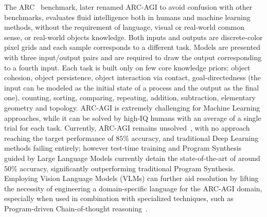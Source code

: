 The ARC~\cite{chollet2019measure} benchmark, later renamed ARC-AGI to avoid confusion with other benchmarks, evaluates fluid intelligence both in humans and machine learning methods, without the requirement of language, visual or real-world common sense, or real-world objects knowledge.
Both inputs and outputs are discrete-color pixel grids and each sample corresponds to a different task.
Models are presented with three input/output pairs and are required to draw the output corresponding to a fourth input.
Each task is built only on few core knowledge priors: object cohesion, object persistence, object interaction via contact, goal-directedness (the input can be modeled as the initial state of a process and the output as the final one), counting, sorting, comparing, repeating, addition, subtraction, elementary geometry and topology.
ARC-AGI is extremely challenging for Machine Learning approaches, while it can be solved by high-IQ humans with an average of a single trial for each task.
%
Currently, ARC-AGI remains unsolved~\cite{chollet2024arc}, with no approach reaching the target performance of $85\%$ accuracy, and traditional Deep Learning methods failing entirely; however test-time training and Program Synthesis guided by Large Language Models currently detain the state-of-the-art of around $50\%$ accuracy, significantly outperforming traditional Program Synthesis. Employing Vision Language Models (VLMs) can further aid resolution by lifting the necessity of engineering a domain-specific language for the ARC-AGI domain, especially when used in combination with specialized techniques, such as Program-driven Chain-of-thought reasoning~\cite{lyu2023faithful}.

